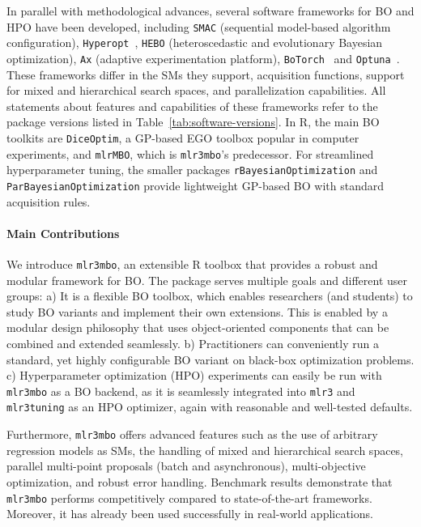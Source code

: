 \documentclass[12pt,letterpaper]{article}
\begin{document}
In parallel with methodological advances, several software frameworks for BO and HPO have been developed, including \texttt{SMAC} (sequential model-based algorithm configuration)\cite{hutter2011, lindauer2022}, \texttt{Hyperopt}~\cite{bergstra2011}, \texttt{HEBO} (heteroscedastic and evolutionary Bayesian optimization)\cite{cowen-rivers2022}, \texttt{Ax} (adaptive experimentation platform)\cite{olson2025}, \texttt{BoTorch}~\cite{balandat2020} and \texttt{Optuna}~\cite{akiba2019}.
These frameworks differ in the SMs they support, acquisition functions, support for mixed and hierarchical search spaces, and parallelization capabilities.
All statements about features and capabilities of these frameworks refer to the package versions listed in Table~\ref{tab:software-versions}.
In R, the main BO toolkits are \texttt{DiceOptim}, a GP-based EGO toolbox popular in computer experiments, and \texttt{mlrMBO}\cite{bischl2018}, which is \texttt{mlr3mbo}'s predecessor.
For streamlined hyperparameter tuning, the smaller packages \texttt{rBayesianOptimization}\cite{yan2016} and \texttt{ParBayesianOptimization}\cite{wilson2018} provide lightweight GP-based BO with standard acquisition rules.

\paragraph{Main Contributions}

We introduce \texttt{mlr3mbo}, an extensible R toolbox that provides a robust and modular framework for BO.
The package serves multiple goals and different user groups: 
a) It is a flexible BO toolbox, which enables researchers (and students) to study BO variants and implement their own extensions. This is enabled by a modular design philosophy that uses object-oriented components that can be combined and extended seamlessly. 
b) Practitioners can conveniently run a standard, yet highly configurable BO variant on black-box optimization problems. 
c) Hyperparameter optimization (HPO) experiments can easily be run with \texttt{mlr3mbo} as a BO backend, as it is seamlessly integrated into \texttt{mlr3} and \texttt{mlr3tuning} as an HPO optimizer, again with reasonable and well-tested defaults. 

Furthermore, \texttt{mlr3mbo} offers advanced features such as the use of arbitrary regression models as SMs, the handling of mixed and hierarchical search spaces, parallel multi-point proposals (batch and asynchronous), multi-objective optimization, and robust error handling.
Benchmark results demonstrate that \texttt{mlr3mbo} performs competitively compared to state-of-the-art frameworks. Moreover, it has already been used successfully in real-world applications\cite{halac2024,ado2025}.
\end{document}
